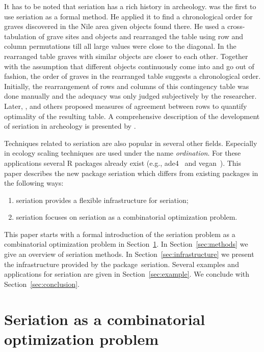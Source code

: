 \documentclass[fleqn, a4paper]{article}
\newcommand{\strong}[1]{{\normalfont\fontseries{b}\selectfont #1}}
\newcommand{\pkg}[1]{\strong{#1}}
\begin{document}
It has to be noted that seriation has a rich history in archeology.
\cite{seriation:Petrie:1899} was the first to use seriation as a formal method.
He applied it to find a chronological order for graves discovered in the Nile
area given objects found there. He used a cross-tabulation of grave sites and
objects and rearranged the table using row and column permutations till all
large values were close to the diagonal. In the rearranged table graves with
similar objects are closer to each other. Together with the assumption that
different objects continuously come into and go out of fashion, the order of
graves in the rearranged table suggests a chronological order.
Initially, the rearrangement of rows and columns of this
contingency table was done manually and the adequacy was only judged
subjectively by the researcher.  Later, \cite{seriation:Robinson:1951},
\cite{seriation:Kendall:1971} and others proposed measures of agreement
between rows to quantify optimality of the resulting table.  A
comprehensive description of the development of seriation in archeology
is presented by \cite{seriation:Ihm:2005}.

Techniques related to seriation are also popular in several other
fields.  Especially in ecology scaling techniques are used under the
name \emph{ordination}.  For these applications several R packages
already exist (e.g., \pkg{ade4}~\citep{seriation:Chessel:2007} and
\pkg{vegan}~\citep{seriation:Oksanen:2007}). This paper describes the new
package \pkg{seriation} which differs from existing packages in the
following ways:
\begin{enumerate}
 \item \pkg{seriation} provides a flexible infrastructure for seriation;
 \item \pkg{seriation} focuses on seriation as a combinatorial
  optimization problem.
\end{enumerate}

This paper starts with a formal introduction of the seriation problem as
a combinatorial optimization problem in Section~\ref{sec:seriation}.  In
Section~\ref{sec:methods} we give an overview of seriation methods.  In
Section~\ref{sec:infrastructure} we present the infrastructure provided
by the package~\pkg{seriation}.  Several examples and applications for
seriation are given in Section~\ref{sec:example}.  We conclude with
Section~\ref{sec:conclusion}.

\section{Seriation as a combinatorial optimization problem}
\label{sec:seriation}
\end{document}
